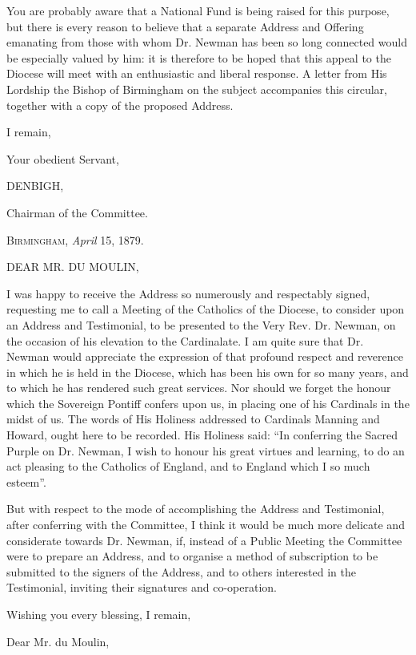 You are probably aware that a National Fund is being raised for
this purpose, but there is every reason to believe that a separate
Address and Offering emanating from those with whom Dr. Newman has
been so long connected would be especially valued by him: it is
therefore to be hoped that this appeal to the Diocese will meet with
an enthusiastic and liberal response. A letter from His Lordship the
Bishop of Birmingham on the subject accompanies this circular,
together with a copy of the proposed Address.

I remain,

Your obedient Servant,

DENBIGH,

Chairman of the Committee.


B\textsc{irmingham}, \emph{April} 15, 1879.

DEAR MR. DU
MOULIN,

I was happy to receive the Address so numerously and respectably
signed, requesting me to call a Meeting of the Catholics of the
Diocese, to consider upon an Address and Testimonial, to be presented
to the Very Rev. Dr. Newman, on the occasion of his elevation to the
Cardinalate. I am quite sure that Dr. Newman would appreciate the
expression of that profound respect and reverence in which he is held
in the Diocese, which has been his own for so many years, and to which
he has rendered such great services. Nor should we forget the honour
which the Sovereign Pontiff confers upon us, in placing one of his
Cardinals in the midst of us. The words of His Holiness addressed to
Cardinals Manning and Howard, ought here to be recorded. His Holiness
said: ``In conferring the Sacred Purple on Dr. Newman, I wish to
honour his great virtues and learning, to do an act pleasing to the
Catholics of England, and to England which I so much esteem''.

But with respect to the mode of accomplishing the Address and
Testimonial, after conferring with the Committee, I think it would be
much more delicate and considerate towards Dr. Newman, if, instead of
a Public Meeting the Committee were to prepare an Address, and to
organise a method of subscription to be submitted to the signers of
the Address, and to others interested in the Testimonial, inviting
their signatures and co-operation.

Wishing you every blessing, I remain,

Dear Mr. du Moulin,

